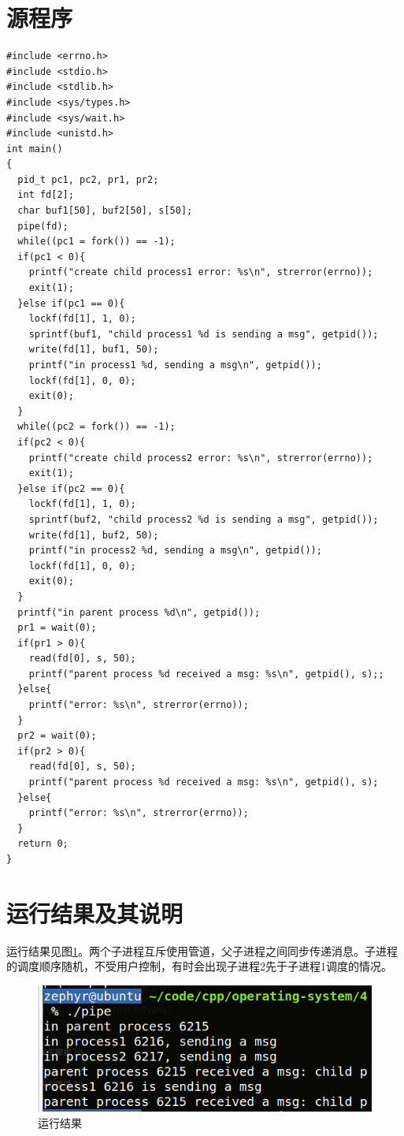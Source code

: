 \documentclass[11pt]{article}
\begin{document}
\section{源程序}
\begin{lstlisting}[caption = {代码清单}, label = {lst: code}]
#include <errno.h>
#include <stdio.h>
#include <stdlib.h>
#include <sys/types.h>
#include <sys/wait.h>
#include <unistd.h>
int main()
{
  pid_t pc1, pc2, pr1, pr2;
  int fd[2];
  char buf1[50], buf2[50], s[50];
  pipe(fd);
  while((pc1 = fork()) == -1);
  if(pc1 < 0){
    printf("create child process1 error: %s\n", strerror(errno));
    exit(1);
  }else if(pc1 == 0){
    lockf(fd[1], 1, 0);
    sprintf(buf1, "child process1 %d is sending a msg", getpid());
    write(fd[1], buf1, 50);
    printf("in process1 %d, sending a msg\n", getpid());
    lockf(fd[1], 0, 0);
    exit(0);
  }
  while((pc2 = fork()) == -1);
  if(pc2 < 0){
    printf("create child process2 error: %s\n", strerror(errno));
    exit(1);
  }else if(pc2 == 0){
    lockf(fd[1], 1, 0);
    sprintf(buf2, "child process2 %d is sending a msg", getpid());
    write(fd[1], buf2, 50);
    printf("in process2 %d, sending a msg\n", getpid());
    lockf(fd[1], 0, 0);
    exit(0);
  }
  printf("in parent process %d\n", getpid());
  pr1 = wait(0);
  if(pr1 > 0){
    read(fd[0], s, 50);
    printf("parent process %d received a msg: %s\n", getpid(), s);;
  }else{
    printf("error: %s\n", strerror(errno));
  }
  pr2 = wait(0);
  if(pr2 > 0){
    read(fd[0], s, 50);
    printf("parent process %d received a msg: %s\n", getpid(), s);
  }else{
    printf("error: %s\n", strerror(errno));
  }
  return 0;
}
\end{lstlisting}

\section{运行结果及其说明}
运行结果见图\ref{fig: pipe}。两个子进程互斥使用管道，父子进程之间同步传递消息。子进程的调度顺序随机，不受用户控制，有时会出现子进程2先于子进程1调度的情况。

\begin{center}
\begin{figure}[htbp]
\includegraphics[width=\textwidth]{pipe.png}
\caption{运行结果}
\label{fig: pipe}
\end{figure}
\end{center}
\end{document}
